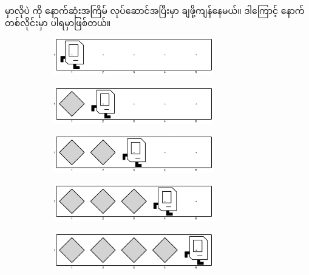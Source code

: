 \begin{sloppypar}
\enForLoop မှာလိုပဲ  \mmBody ကို နောက်ဆုံးအကြိမ် လုပ်ဆောင်အပြီးမှာ \mmbeeper ချဖို့ကျန်နေမယ်။ ဒါကြောင့် \enWhileLoopBody နောက်တစ်လိုင်းမှာ  ပါရမှာဖြစ်တယ်။

\begin{figure}[tbh!]
    \caption{}
    \begin{subfigure}[t]{0.46\textwidth}
        \includegraphics[width=2.75in, left]{ch02/MakeBeeperRow/init.jpg}
        \caption{}
        \label{subfig:MakeBeeperRowA}
    \end{subfigure}

    \begin{subfigure}[t]{0.46\textwidth}
        \includegraphics[width=2.75in, left]{ch02/MakeBeeperRow/1st_iter.jpg}
        \caption{}
    \end{subfigure}

    \begin{subfigure}[t]{0.46\textwidth}
        \includegraphics[width=2.75in, left]{ch02/MakeBeeperRow/2nd_iter.jpg}
        \caption{}
    \end{subfigure}

    \begin{subfigure}[t]{0.46\textwidth}
        \includegraphics[width=2.75in, left]{ch02/MakeBeeperRow/3rd_iter.jpg}
        \caption{}
    \end{subfigure}

    \begin{subfigure}[t]{0.46\textwidth}
        \includegraphics[width=2.75in, left]{ch02/MakeBeeperRow/4th_iter.jpg}
        \caption{}
    \end{subfigure}
    \label{fig:MakeBeeperRowIters}
\end{figure}


\end{sloppypar}
